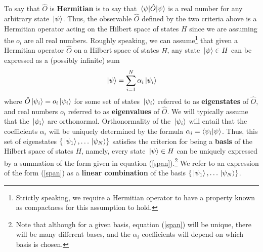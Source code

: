 To say that $\hat{O}$ is \textbf{Hermitian} is to say that $\ev*{\hat{O}}{\psi}$ is a real number for any arbitrary state $\ket*{\psi}$. Thus, the observable $\hat{O}$ defined by the two criteria above is a Hermitian operator acting on the Hilbert space of states $H$ since we are assuming the $o_i$ are all real numbers. { Roughly speaking, we can assume\footnote{Strictly speaking, we require a Hermitian operator to have a property known as compactness for this assumption to hold.}  that given a Hermitian operator} $\hat{O}$ on a Hilbert space of states $H$, any state $\ket*{\psi}\in H$ can be expressed as a (possibly infinite) sum 
\begin{equation}\label{span}
\ket*{\psi}=\sum_{i=1}^N\alpha_i\ket*{\psi_i}
\end{equation}
where $\hat{O}\ket*{\psi_i}=o_i\ket*{\psi_i}$ for some set of states $\ket*{\psi_i}$ referred to as \textbf{eigenstates}\label{eigendef} of $\hat{O}$, and real numbers $o_i$ referred to as \textbf{eigenvalues} of $\hat{O}$. We will typically assume that the $\ket*{\psi_i}$ are orthonormal. Orthonormality of the $\ket*{\psi_i}$ will entail that the coefficients $\alpha_i$ will be uniquely determined by the formula $\alpha_i=\ip{\psi_i}{\psi}$. Thus, this set of eigenstates $\{\ket*{\psi_1},\ldots\ket*{\psi_N}\}$ satisfies the criterion for being a \textbf{basis} of the Hilbert space of states $H$, namely, every state $\ket*{\psi}\in H$ can be uniquely expressed by a summation of the form given in equation (\ref{span}).\footnote{Note that although for a given basis, equation (\ref{span}) will be unique, there will be many different bases, and the $\alpha_i$ coefficients will depend on which basis is chosen.} We refer to an expression of the form (\ref{span}) as a \textbf{linear combination} of the basis $\{\ket*{\psi_1},\ldots\ket*{\psi_N}\}$. 
